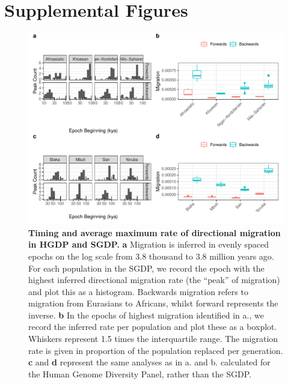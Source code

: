 \documentclass{article}
\begin{document}
\setcounter{section}{0}
\renewcommand{\thesection}{S\arabic{section}}%
\setcounter{table}{0}
\renewcommand{\thetable}{S\arabic{table}}%
\setcounter{figure}{0}
\renewcommand{\thefigure}{S\arabic{figure}}%


\baselineskip
\tableofcontents
\newpage

\section{Supplemental Figures}


\begin{figure}
    \centering
    \includegraphics[width=\textwidth]{plot/peaks.pdf}
    \caption{{\bf Timing and average maximum rate of directional migration in HGDP and SGDP.} {\bf a} Migration is inferred in evenly spaced epochs on the log scale from 3.8 thousand to 3.8 million years ago. For each population in the SGDP, we record the epoch with the highest inferred directional migration rate (the ``peak'' of migration) and plot this as a histogram. Backwards migration refers to migration from Eurasians to Africans, whilst forward represents the inverse. {\bf b} In the epochs of highest migration identified in a., we record the inferred rate per population and plot these as a boxplot. Whiskers represent 1.5 times the interquartile range. The migration rate is given in proportion of the population replaced per generation. {\bf c} and {\bf d} represent the same analyses as in a. and b. calculated for the Human Genome Diversity Panel, rather than the SGDP.}
    \label{fig:peaks}
\end{figure}
\newpage
\end{document}
